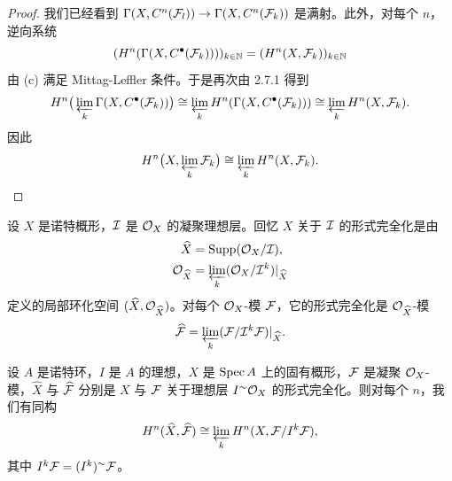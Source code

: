 \begin{proof}
我们已经看到 $\Gamma(X,C^n(\mathcal{F}_l))\to\Gamma(X,C^n(\mathcal{F}_k))$ 是满射。此外，对每个 $n$，逆向系统
\begin{equation*}
(H^n(\Gamma(X,C^{\bullet}(\mathcal{F}_k))))_{k\in\mathbb{N}}=(H^n(X,\mathcal{F}_k))_{k\in\mathbb{N}}
\end{equation*}
由 (c) 满足 Mittag-Leffler 条件。于是再次由 2.7.1 得到
\begin{equation*}
H^n\big(\varprojlim_k\Gamma(X,C^{\bullet}(\mathcal{F}_k))\big)\cong\varprojlim_k H^n(\Gamma(X,C^{\bullet}(\mathcal{F}_k)))\cong\varprojlim_k H^n(X,\mathcal{F}_k).
\end{equation*}
因此
\begin{equation*}
H^n\big(X,\varprojlim_k\mathcal{F}_k\big)\cong\varprojlim_k H^n(X,\mathcal{F}_k).
\end{equation*}
\end{proof}

设 $X$ 是诺特概形，$\mathcal{I}$ 是 $\mathcal{O}_X$ 的凝聚理想层。回忆 $X$ 关于 $\mathcal{I}$ 的形式完全化是由
\begin{align*}
\widehat{X}&=\operatorname{Supp}(\mathcal{O}_X/\mathcal{I}),\\
\mathcal{O}_{\widehat{X}}&=\varprojlim_k(\mathcal{O}_X/\mathcal{I}^k)|_{\widehat{X}}
\end{align*}
定义的局部环化空间 $(\widehat{X},\mathcal{O}_{\widehat{X}})$。对每个 $\mathcal{O}_X$-模 $\mathcal{F}$，它的形式完全化是 $\mathcal{O}_{\widehat{X}}$-模
\begin{equation*}
\widehat{\mathcal{F}}=\varprojlim_k(\mathcal{F}/\mathcal{I}^k\mathcal{F})|_{\widehat{X}}.
\end{equation*}

\begin{theorem}\label{it:2.7.4}
设 $A$ 是诺特环，$I$ 是 $A$ 的理想，$X$ 是 $\operatorname{Spec} A$ 上的固有概形，$\mathcal{F}$ 是凝聚 $\mathcal{O}_X$-模，$\widehat{X}$ 与 $\widehat{\mathcal{F}}$ 分别是 $X$ 与 $\mathcal{F}$ 关于理想层 $I^{\sim}\mathcal{O}_X$ 的形式完全化。则对每个 $n$，我们有同构
\begin{equation*}
H^n(\widehat{X},\widehat{\mathcal{F}})\cong\varprojlim_k H^n(X,\mathcal{F}/I^k\mathcal{F}),
\end{equation*}
其中 $I^k\mathcal{F}=(I^k)^{\sim}\mathcal{F}$。
\end{theorem}


